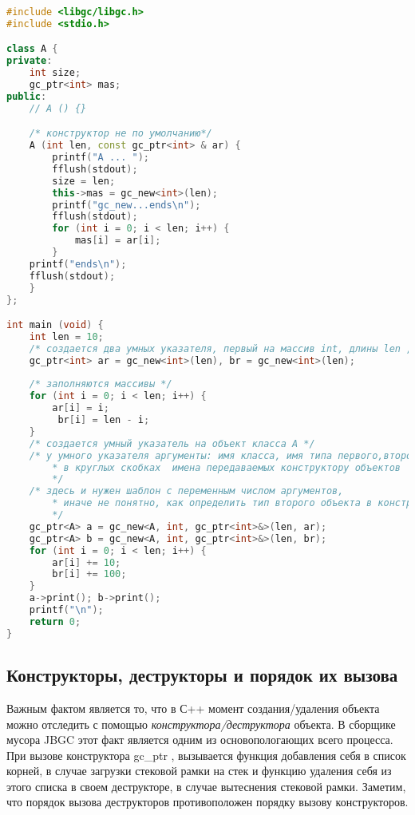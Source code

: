 \begin{lstlisting}[language= C++]
#include <libgc/libgc.h>
#include <stdio.h>

class A {
private:
	int size;
	gc_ptr<int> mas;
public:
  	// A () {}

	/* конструктор не по умолчанию*/
	A (int len, const gc_ptr<int> & ar) {
		printf("A ... ");
		fflush(stdout);
		size = len;
		this->mas = gc_new<int>(len);
		printf("gc_new...ends\n");
		fflush(stdout);
		for (int i = 0; i < len; i++) {
			mas[i] = ar[i];
		}
	printf("ends\n");
	fflush(stdout);
  	}
};

int main (void) {
	int len = 10;
	/* создается два умных указателя, первый на массив int, длины len ,второй такой же */
	gc_ptr<int> ar = gc_new<int>(len), br = gc_new<int>(len);
	
	/* заполняются массивы */
	for (int i = 0; i < len; i++) {
		ar[i] = i;
		 br[i] = len - i;
	}
	/* создается умный указатель на объект класса А */
	/* у умного указателя аргументы: имя класса, имя типа первого,второго поля;
	    * в круглых скобках  имена передаваемых конструктору объектов
	    */
	/* здесь и нужен шаблон с переменным числом аргументов,
	    * иначе не понятно, как определить тип второго объекта в конструкторе 
	    */
	gc_ptr<A> a = gc_new<A, int, gc_ptr<int>&>(len, ar);
	gc_ptr<A> b = gc_new<A, int, gc_ptr<int>&>(len, br);
	for (int i = 0; i < len; i++) {
		ar[i] += 10;
		br[i] += 100;
  	}
	a->print(); b->print();
	printf("\n");
	return 0;
}

\end{lstlisting}
 \subsection{Конструкторы, деструкторы и порядок их вызова} 

Важным фактом является то, что в С++  момент создания/удаления объекта можно отследить с помощью \textit{конструктора/деструктора} объекта. В сборщике мусора JBGC этот факт является одним из основопологающих всего процесса. При вызове конструктора gc\_ptr , вызывается функция добавления себя в список корней, в случае загрузки стековой рамки на стек и функцию удаления себя из этого списка в своем деструкторе, в случае вытеснения стековой рамки. Заметим, что порядок вызова деструкторов противоположен порядку вызову конструкторов. 